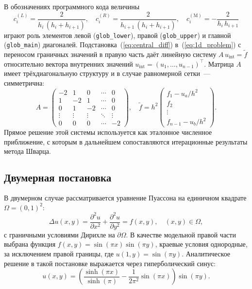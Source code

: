 В обозначениях программного кода величины
\begin{equation}\label{eq:coeffs_1d}
    c^{(L)}_i = \frac{2}{h_i\,(h_i+h_{i+1})},\quad
    c^{(R)}_i = \frac{2}{h_{i+1}\,(h_i+h_{i+1})},\quad
    c^{(\mathrm{M})}_i = -\frac{2}{h_i\,h_{i+1}}
\end{equation}
играют роль элементов левой (\texttt{glob\_lower}), правой
(\texttt{glob\_upper}) и главной (\texttt{glob\_main}) диагоналей.
Подстановка~(\ref{eq:central_diff}) в~(\ref{eq:1d_problem}) с переносом
граничных значений в правую часть даёт линейную систему
$A\,u_{\mathrm{int}} = \tilde{f}$ относительно вектора внутренних значений
$u_{\mathrm{int}}=(u_1,\dots,u_{n-1})^\top$. Матрица $A$ имеет
трёхдиагональную структуру и в случае равномерной сетки~--- симметрична:
\begin{equation}\label{eq:tridiag}
    A = \begin{pmatrix}
        -2 & 1  & 0      & \cdots & 0   \\
        1  & -2 & 1      & \cdots & 0   \\
        0  & 1  & -2     & \cdots & 0   \\
        \vdots & \vdots & \vdots & \ddots & \vdots \\
        0  & 0  & 0      & \cdots & -2
    \end{pmatrix},\quad
    \tilde{f} = h^2\!
    \begin{pmatrix}
        f_1 - u_a/h^2 \\
        f_2 \\
        \vdots \\
        f_{n-1} - u_b/h^2
    \end{pmatrix}.
\end{equation}
Прямое решение этой системы используется как эталонное численное приближение,
с которым в дальнейшем сопоставляются итерационные результаты метода Шварца.

\subsection{Двумерная постановка}

В двумерном случае рассматривается уравнение Пуассона на единичном квадрате
$\Omega=(0,1)^2$:
\begin{equation}\label{eq:2d_problem}
    \Delta u(x,y) =
    \frac{\partial^{2}u}{\partial x^{2}} +
    \frac{\partial^{2}u}{\partial y^{2}} =
    f(x,y),
    \quad (x,y)\in\Omega,
\end{equation}
с граничными условиями Дирихле на $\partial\Omega$. В качестве модельной правой
части выбрана функция $f(x,y)=\sin(\pi x)\sin(\pi y)$, краевые условия
однородные, за исключением правой границы, где $u(1,y)=\sin(\pi y)$.
Аналитическое решение в такой постановке выражается через гиперболический
синус:
\begin{equation}\label{eq:exact_2d}
    u(x,y) = \left(\frac{\sinh(\pi x)}{\sinh(\pi)}
        - \frac{1}{2\pi^{2}}\sin(\pi x)\right)\sin(\pi y).
\end{equation}

